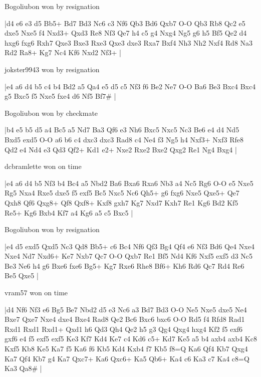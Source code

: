 \showboard

Bogoliubon won by resignation

\makegametitle
|d4 e6 e3 d5 Bb5+ Bd7 Bd3 Nc6 c3 Nf6 Qb3 Bd6 Qxb7 O-O Qb3 Rb8 Qc2 e5 dxe5 Nxe5 f4 Nxd3+ Qxd3 Re8 Nf3 Qe7 h4 c5 g4 Nxg4 Ng5 g6 h5 Bf5 Qe2 d4 hxg6 fxg6 Rxh7 Qxe3 Bxe3 Rxe3 Qxe3 dxe3 Rxa7 Bxf4 Nh3 Nh2 Nxf4 Rd8 Na3 Rd2 Ra8+ Kg7 Nc4 Kf6 Nxd2 Nf3+  |

\showboard

jokster9943 won by resignation

\makegametitle
|e4 a6 d4 b5 c4 b4 Bd2 a5 Qa4 e5 d5 c5 Nf3 f6 Be2 Ne7 O-O Ba6 Be3 Bxc4 Bxc4 g5 Bxc5 f5 Nxe5 fxe4 d6 Nf5 Bf7\#  |

\showboard

Bogoliubon won by checkmate

\makegametitle
|b4 e5 b5 d5 a4 Bc5 a5 Nd7 Ba3 Qf6 e3 Nh6 Bxc5 Nxc5 Nc3 Be6 e4 d4 Nd5 Bxd5 exd5 O-O a6 b6 c4 dxc3 dxc3 Rad8 c4 Ne4 f3 Ng5 h4 Nxf3+ Nxf3 Rfe8 Qd2 e4 Nd4 e3 Qd3 Qf2+ Kd1 e2+ Nxe2 Rxe2 Bxe2 Qxg2 Re1 Ng4 Bxg4  |

\showboard

dcbramlette won on time

\makegametitle
|e4 a6 d4 b5 Nf3 b4 Bc4 a5 Nbd2 Ba6 Bxa6 Rxa6 Nb3 a4 Nc5 Rg6 O-O e5 Nxe5 Rg5 Nxa4 Rxe5 dxe5 f5 exf5 Bc5 Nxc5 Nc6 Qh5+ g6 fxg6 Nxe5 Qxe5+ Qe7 Qxh8 Qf6 Qxg8+ Qf8 Qxf8+ Kxf8 gxh7 Kg7 Nxd7 Kxh7 Re1 Kg6 Bd2 Kf5 Re5+ Kg6 Bxb4 Kf7 a4 Kg6 a5 c5 Bxc5  |

\showboard

Bogoliubon won by resignation

\makegametitle
|e4 d5 exd5 Qxd5 Nc3 Qd8 Bb5+ c6 Bc4 Nf6 Qf3 Bg4 Qf4 e6 Nf3 Bd6 Qe4 Nxe4 Nxe4 Nd7 Nxd6+ Ke7 Nxb7 Qc7 O-O Qxb7 Re1 Bf5 Nd4 Kf6 Nxf5 exf5 d3 Nc5 Be3 Ne6 h4 g6 Bxe6 fxe6 Bg5+ Kg7 Rxe6 Rhe8 Bf6+ Kh6 Rd6 Qc7 Rd4 Re6 Be5 Qxe5  |

\showboard

vram57 won on time

\makegametitle
|d4 Nf6 Nf3 e6 Bg5 Be7 Nbd2 d5 e3 Nc6 a3 Bd7 Bd3 O-O Ne5 Nxe5 dxe5 Ne4 Bxe7 Qxe7 Nxe4 dxe4 Bxe4 Rad8 Qe2 Bc6 Bxc6 bxc6 O-O Rd5 f4 Rfd8 Rad1 Rxd1 Rxd1 Rxd1+ Qxd1 h6 Qd3 Qh4 Qe2 h5 g3 Qg4 Qxg4 hxg4 Kf2 f5 exf6 gxf6 e4 f5 exf5 exf5 Ke3 Kf7 Kd4 Ke7 c4 Kd6 c5+ Kd7 Ke5 a5 b4 axb4 axb4 Kc8 Kxf5 Kb8 Ke5 Ka7 f5 Ka6 f6 Kb5 Kd4 Kxb4 f7 Kb5 f8=Q Ka6 Qf4 Kb7 Qxg4 Ka7 Qf4 Kb7 g4 Ka7 Qxc7+ Ka6 Qxc6+ Ka5 Qb6+ Ka4 c6 Ka3 c7 Ka4 c8=Q Ka3 Qa8\#  |

